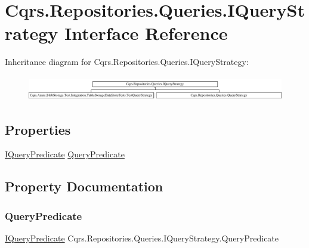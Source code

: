 \hypertarget{interfaceCqrs_1_1Repositories_1_1Queries_1_1IQueryStrategy}{}\section{Cqrs.\+Repositories.\+Queries.\+I\+Query\+Strategy Interface Reference}
\label{interfaceCqrs_1_1Repositories_1_1Queries_1_1IQueryStrategy}
Inheritance diagram for Cqrs.\+Repositories.\+Queries.\+I\+Query\+Strategy\+:\begin{figure}[H]
\begin{center}
\leavevmode
\includegraphics[height=1.074856cm]{interfaceCqrs_1_1Repositories_1_1Queries_1_1IQueryStrategy}
\end{center}
\end{figure}
\subsection*{Properties}
\begin{DoxyCompactItemize}
\item 
\hyperlink{interfaceCqrs_1_1Repositories_1_1Queries_1_1IQueryPredicate}{I\+Query\+Predicate} \hyperlink{interfaceCqrs_1_1Repositories_1_1Queries_1_1IQueryStrategy_ab36e17425ab9940bfa4f104e7f321b90_ab36e17425ab9940bfa4f104e7f321b90}{Query\+Predicate}
\end{DoxyCompactItemize}


\subsection{Property Documentation}
\mbox{\label{interfaceCqrs_1_1Repositories_1_1Queries_1_1IQueryStrategy_ab36e17425ab9940bfa4f104e7f321b90_ab36e17425ab9940bfa4f104e7f321b90}} 
\subsubsection{\texorpdfstring{Query\+Predicate}{QueryPredicate}}
{\footnotesize\ttfamily \hyperlink{interfaceCqrs_1_1Repositories_1_1Queries_1_1IQueryPredicate}{I\+Query\+Predicate} Cqrs.\+Repositories.\+Queries.\+I\+Query\+Strategy.\+Query\+Predicate\hspace{0.3cm}{\ttfamily [get]}}

